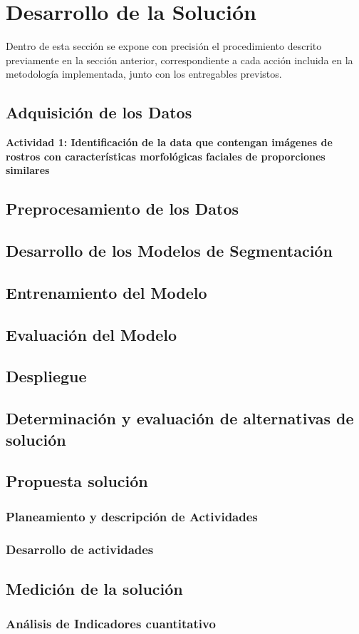 \chapter{Desarrollo de la Solución}
Dentro de esta sección se expone con precisión el procedimiento descrito previamente en la sección anterior, correspondiente a cada acción incluida en la metodología implementada, junto con los entregables previstos.

\section{Adquisición de los Datos}

\textbf{Actividad 1: Identificación de la data que contengan imágenes de rostros con características morfológicas faciales de proporciones similares}
 


\section{Preprocesamiento de los Datos}

\section{Desarrollo de los Modelos de Segmentación}

\section{Entrenamiento del Modelo}

\section{Evaluación del Modelo}

\section{Despliegue}

\section{Determinación y evaluación de alternativas de solución}

\section{Propuesta solución}

\subsection{Planeamiento y descripción de Actividades}

\subsection{Desarrollo de actividades}

\section{Medición de la solución}

\subsection{Análisis de Indicadores cuantitativo}
